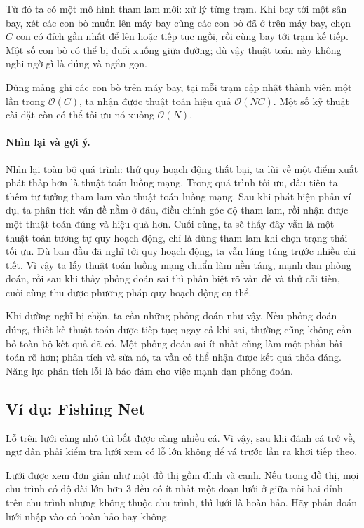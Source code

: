 \documentclass[11pt]{article}
\newcommand{\Oh}{\mathcal{O}}
\begin{document}
Từ đó ta có một mô hình tham lam mới: xử lý từng trạm. Khi bay tới một sân
bay, xét các con bò muốn lên máy bay cùng các con bò đã ở trên máy bay, chọn
\(C\) con có đích gần nhất để lên hoặc tiếp tục ngồi, rồi cùng bay tới trạm
kế tiếp. Một số con bò có thể bị đuổi xuống giữa đường; dù vậy thuật toán này
không nghi ngờ gì là đúng và ngắn gọn.

Dùng mảng ghi các con bò trên máy bay, tại mỗi trạm cập nhật thành viên một
lần trong \(\Oh(C)\), ta nhận được thuật toán hiệu quả \(\Oh(NC)\). Một số kỹ
thuật cài đặt còn có thể tối ưu nó xuống \(\Oh(N)\).

\paragraph{Nhìn lại và gợi ý.}
Nhìn lại toàn bộ quá trình: thử quy hoạch động thất bại, ta lùi về một điểm
xuất phát thấp hơn là thuật toán luồng mạng. Trong quá trình tối ưu, đầu tiên
ta thêm tư tưởng tham lam vào thuật toán luồng mạng. Sau khi phát hiện phản
ví dụ, ta phân tích vấn đề nằm ở đâu, điều chỉnh góc độ tham lam, rồi nhận
được một thuật toán đúng và hiệu quả hơn. Cuối cùng, ta sẽ thấy đây vẫn là
một thuật toán tương tự quy hoạch động, chỉ là dùng tham lam khi chọn trạng
thái tối ưu. Dù ban đầu đã nghĩ tới quy hoạch động, ta vẫn lúng túng trước
nhiều chi tiết. Vì vậy ta lấy thuật toán luồng mạng chuẩn làm nền tảng, mạnh
dạn phỏng đoán, rồi sau khi thấy phỏng đoán sai thì phân biệt rõ vấn đề và
thử cải tiến, cuối cùng thu được phương pháp quy hoạch động cụ thể.

Khi đường nghĩ bị chặn, ta cần những phỏng đoán như vậy. Nếu phỏng đoán đúng,
thiết kế thuật toán được tiếp tục; ngay cả khi sai, thường cũng không cần bỏ
toàn bộ kết quả đã có. Một phỏng đoán sai ít nhất cũng làm một phần bài toán
rõ hơn; phân tích và sửa nó, ta vẫn có thể nhận được kết quả thỏa đáng. Năng
lực phân tích lỗi là bảo đảm cho việc mạnh dạn phỏng đoán.

\subsection{Ví dụ: Fishing Net}

Lỗ trên lưới càng nhỏ thì bắt được càng nhiều cá. Vì vậy, sau khi đánh cá trở
về, ngư dân phải kiểm tra lưới xem có lỗ lớn không để vá trước lần ra khơi
tiếp theo.

Lưới được xem đơn giản như một đồ thị gồm đỉnh và cạnh. Nếu trong đồ thị, mọi
chu trình có độ dài lớn hơn \(3\) đều có ít nhất một đoạn lưới ở giữa nối hai
đỉnh trên chu trình nhưng không thuộc chu trình, thì lưới là hoàn hảo. Hãy
phán đoán lưới nhập vào có hoàn hảo hay không.
\end{document}
